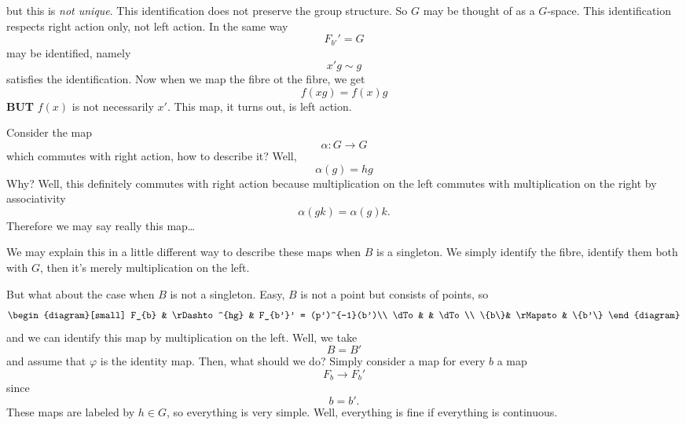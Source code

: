 \begin{ex}
but this is \emph{not unique}. This identification does not
preserve the group structure. So $G$ may be thought of as a
$G$-space. This identification respects right action only, not
left action.
In the same way
\begin{equation}
F_{b'}'=G
\end{equation}
may be identified, namely
\begin{equation}
x'g\sim g
\end{equation}
satisfies the identification. Now when we map the fibre ot the
fibre, we get
\begin{equation}
f(xg)=f(x)g
\end{equation}
\textbf{BUT} $f(x)$ is not necessarily $x'$. This map, it turns
out, is left action.
\end{ex}
Consider the map 
\begin{equation}
\alpha\colon G\to G
\end{equation}
which commutes with right action, how to describe it?
Well,
\begin{equation}
\alpha(g)=hg
\end{equation}
Why? Well, this definitely commutes with right action because
multiplication on the left commutes with multiplication on the
right by associativity
\begin{equation}
\alpha(gk)=\alpha(g)k.
\end{equation}
Therefore we may say really this map\dots

We may explain this in a little different way to describe these
maps when $B$ is a singleton. We simply identify the fibre,
identify them both with $G$, then it's merely multiplication on
the left.

But what about the case when $B$ is not a singleton. Easy, $B$ is
not a point but consists of points, so
\begin{equation}
\begin{diagram}[small]
F_{b} & \rDashto^{hg} & F_{b'}' = (p')^{-1}(b')\\
\dTo &                & \dTo \\
\{b\}& \rMapsto       & \{b'\}
\end{diagram}
\end{equation}
and we can identify this map by multiplication on the left.
Well, we take
\begin{equation}
B=B'
\end{equation}
and assume that $\varphi$ is the identity map. Then, what should
we do? Simply consider a map for every $b$ a map
\begin{equation}
F_{b}\to F_{b}'
\end{equation}
since 
\begin{equation}
b=b'.
\end{equation}
These maps are labeled by $h\in G$, so everything is very
simple. Well, everything is fine if everything is continuous.

